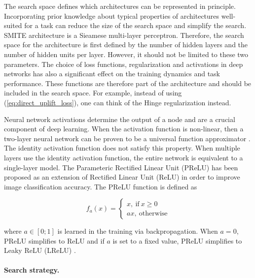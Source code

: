 \documentclass{article}
\begin{document}
The search space defines which architectures can be represented
in principle. Incorporating prior knowledge about typical properties of architectures well-suited for a task can reduce the size of the search space and simplify the search. SMITE architecture is a Sieamese multi-layer perceptron. Therefore, the search space for the architecture is first defined by the number of hidden layers and the number of hidden units per layer. However, it should not be limited to these two parameters. The choice of loss functions, regularization and activations in deep networks has also a significant effect on the training dynamics and task performance. These functions are therefore part of the architecture and should be included in the search space. For example, instead of using (\ref{eq:direct_uplift_loss}), one can think of the Hinge regularization instead.

Neural network activations determine the output of a node and are a crucial component of deep learning. When the activation function is non-linear, then a two-layer neural network can be proven to be a universal function approximator \citep{cybenko1989approximation}. The identity activation function does not satisfy this property. When multiple layers use the identity activation function, the entire network is equivalent to a single-layer model. The Parameteric Rectified Linear Unit (PReLU) \citep{he2015delving} has been proposed as an extension of Rectified Linear Unit (ReLU) \citep{nair2010rectified} in order to improve image classification accuracy. The PReLU function is defined as

\[
f_a (x) = 
\begin{cases}
    x, ~\mathrm{if}~ x \geq 0\\
    ax, ~\mathrm{otherwise}
\end{cases}
\]

where $a \in [0;1]$ is learned in the training via backpropagation. When $a=0$, PReLU simplifies to ReLU and if $a$ is set to a fixed value, PReLU simplifies to Leaky ReLU (LReLU)  \citep{maas2013rectifier}.

\paragraph{Search strategy.}
\end{document}

